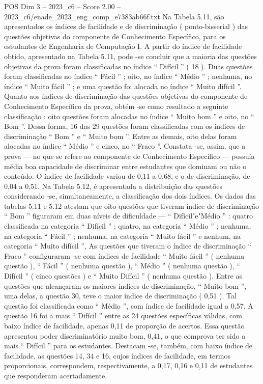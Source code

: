 \begin{textsample}{POS Dim 3 – 2023\_c6 – Score 2.00 – 2023\_c6/enade\_2023\_eng\_comp\_e7383ab66f.txt}
Na Tabela 5.11, são apresentados os índices de facilidade e de discriminação ( ponto-bisserial ) das questões objetivas do componente de Conhecimento Específico, para os estudantes de Engenharia de Computação I.
A partir do índice de facilidade obtido, apresentado na Tabela 5.11, pode -se concluir que a maioria das questões objetivas da prova foram classificadas no índice “ Difícil ” ( 18 ).
Duas questões foram classificadas no índice “ Fácil ” ; oito, no índice “ Médio ” ; nenhuma, no índice “ Muito fácil ” ; e uma questão foi alocada no índice “ Muito difícil ”.
Quanto aos índices de discriminação das questões objetivas do componente de Conhecimento Específico da prova, obtém -se como resultado a seguinte classificação : oito questões foram alocadas no índice “ Muito bom ” e oito, no “ Bom ”.
Dessa forma, 16 das 29 questões foram classificadas com os índices de discriminação “ Bom ” e “ Muito bom ”.
Entre as demais, oito delas foram alocadas no índice “ Médio ” e cinco, no “ Fraco ”.
Constata -se, assim, que a prova — no que se refere ao componente de Conhecimento Específico — possuía média boa capacidade de discriminar entre estudantes que dominam ou não o conteúdo.
O índice de facilidade variou de 0,11 a 0,68, e o de discriminação, de 0,04 a 0,51.
Na Tabela 5.12, é apresentada a distribuição das questões considerando -se, simultaneamente, a classificação dos dois índices.
Os dados das tabelas 5.11 e 5.12 atestam que oito questões que tiveram índice de discriminação “ Bom ” figuraram em duas níveis de dificuldade — “ Difícil"e"Médio ” : quatro classificada na categoria “ Difícil ” ; quatro, na categoria “ Médio ” ; nenhuma, na categoria “ Fácil ” ; nenhuma, na categoria “ Muito fácil ” e nenhum, na categoria “ Muito difícil ”, As questões que tiveram o índice de discriminação “ Fraco ” configuraram -se com índices de facilidade “ Muito fácil ” ( nenhuma questão ), “ Fácil ” ( nenhuma questão ), “ Médio ” ( nenhuma questão ), “ Difícil ” ( cinco questões ) e “ Muito Difícil ” ( nenhuma questão ).
Entre as questões que alcançaram os maiores índices de discriminação, “ Muito bom ”, uma delas, a questão 30, teve o maior índice de discriminação ( 0,51 ).
Tal questão foi classificada como “ Médio ”, com índice de facilidade igual a 0,57.
A questão 16 foi a mais “ Difícil ” entre as 24 questões específicas válidas, com baixo índice de facilidade, apenas 0,11 de proporção de acertos.
Essa questão apresentou poder discriminatório muito bom, 0,41, o que comprova ter sido a mais “ Difícil ” para os estudantes.
Destacam -se, também, com baixo índice de facilidade, as questões 14, 34 e 16, cujos índices de facilidade, em termos proporcionais, correspondem, respectivamente, a 0,17, 0,16 e 0,11 de estudantes que responderam acertadamente.

\end{textsample}
